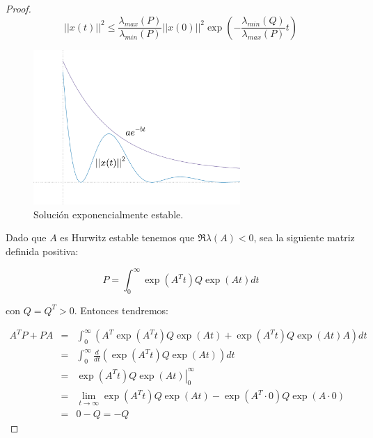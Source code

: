 \begin{proof}
            \begin{equation*}
                ||x(t)||^2 \le \frac{\lambda_{max}(P)}{\lambda_{min}(P)} ||x(0)||^2 \exp{\left( - \frac{\lambda_{min}(Q)}{\lambda_{max}(P)} t \right)}
            \end{equation*}

            \begin{figure}
                \centering
                \includegraphics[width=0.7\textwidth]{./imagenes/trayectoria.pdf}
                \caption{\label{fig:trayectoria}Solución exponencialmente estable.}
            \end{figure}

            Dado que $A$ es Hurwitz estable tenemos que $\Re{\lambda(A)} < 0$, sea la siguiente matriz definida positiva:

            \begin{equation*}
                P = \int_0^{\infty} \exp{(A^Tt)} Q \exp(At) dt
            \end{equation*}

            con $Q = Q^T > 0$. Entonces tendremos:

            \begin{eqnarray*}
                A^T P + P A & = & \int_0^{\infty} \left( A^T \exp{(A^T t)} Q \exp{(At)} + \exp{(A^T t)} Q \exp{(At)} A \right) dt \\
                & = & \int_0^{\infty} \frac{d}{dt} \left( \exp{(A^T t)} Q \exp{(At)} \right) dt \\
                & = & \left. \exp{(A^T t)} Q \exp{(At)} \right|_0^{\infty} \\
                & = & \lim_{t \to \infty} \exp{(A^T t)} Q \exp{(At)} - \exp{(A^T \cdot 0)} Q \exp{(A \cdot 0)} \\
                & = & 0 - Q = - Q
            \end{eqnarray*}
        \end{proof}

